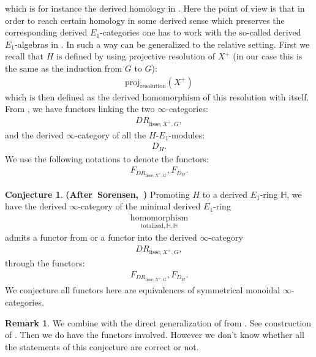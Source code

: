 \documentclass[12pt]{article}
\theoremstyle{definition}
\newtheorem{remark}{Remark}
\newtheorem{conjecture}{Conjecture}
\begin{document}
which is for instance the derived homology in \cite{Sa}. Here the point of view is that in order to reach certain homology in some derived sense which preserves the corresponding derived $E_1$-categories one has to work with the so-called derived $E_1$-algebras in \cite{Sa}. In such a way \cite{So1} can be generalized to the relative setting. First we recall that $H$ is defined by using projective resolution of $X^+$ (in our case this is the same as the induction from $G$ to $G$):
\begin{align}
\mathrm{proj}_\mathrm{resolution}(X^+)
\end{align}
which is then defined as the derived homomorphism of this resolution with itself. From \cite{Sc1}, \cite{HM} we have functors linking the two $\infty$-categories:
\begin{align}
DR_{\mathrm{lisse},X^+,G},
\end{align}
and the derived $\infty$-category of all the $H$-$E_1$-modules:
\begin{align}
D_H.
\end{align}
We use the following notations to denote the functors:
\begin{align}
F_{DR_{\mathrm{lisse},X^+,G}}, F_{D_H}.
\end{align}



\begin{conjecture}\mbox{\textbf{(After Sorensen, \cite[Theorem 1.1]{So1})}}
Promoting $H$ to a derived $E_1$-ring $\mathbb{H}$, we have the derived $\infty$-category of the minimal derived $E_1$-ring
\begin{align}
\underset{{\mathrm{totalized},\mathbb{H},\mathbb{H}}}{\mathrm{homomorphism}}
\end{align}
admits a functor from or a functor into the derived $\infty$-category
\begin{align}
DR_{\mathrm{lisse},X^+,G},
\end{align}
through the functors:
\begin{align}
F_{DR_{\mathrm{lisse},X^+,G}}, F_{D_H}.
\end{align}
We conjecture all functors here are equivalences of symmetrical monoidal $\infty$-categories.
\end{conjecture}

\begin{remark}
We combine \cite[Theorem 1.2]{Sa} with the direct generalization of \cite{Sc1} from \cite{HM}. See construction of \cite[Theorem 9]{Sc1}. Then we do have the functors involved. However we don't know whether all the statements of this conjecture are correct or not.
\end{remark}
\end{document}
